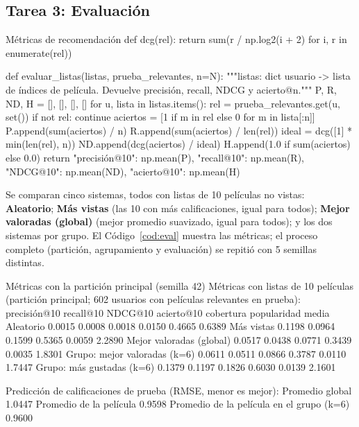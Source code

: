 \documentclass[11pt,letterpaper]{article}
\begin{document}
\subsection{Tarea 3: Evaluación}

\begin{codigo}[label=cod:eval]{Métricas de recomendación}
def dcg(rel):
    return sum(r / np.log2(i + 2) for i, r in enumerate(rel))


def evaluar_listas(listas, prueba_relevantes, n=N):
    """listas: dict usuario -> lista de índices de película. Devuelve precisión, recall, NDCG y acierto@n."""
    P, R, ND, H = [], [], [], []
    for u, lista in listas.items():
        rel = prueba_relevantes.get(u, set())
        if not rel:
            continue
        aciertos = [1 if m in rel else 0 for m in lista[:n]]
        P.append(sum(aciertos) / n)
        R.append(sum(aciertos) / len(rel))
        ideal = dcg([1] * min(len(rel), n))
        ND.append(dcg(aciertos) / ideal)
        H.append(1.0 if sum(aciertos) else 0.0)
    return {"precisión@10": np.mean(P), "recall@10": np.mean(R), "NDCG@10": np.mean(ND), "acierto@10": np.mean(H)}
\end{codigo}

Se comparan cinco sistemas, todos con listas de 10 películas no vistas: \textbf{Aleatorio}; \textbf{Más vistas} (las 10 con más calificaciones, igual para todos); \textbf{Mejor valoradas (global)} (mejor promedio suavizado, igual para todos); y los dos sistemas por grupo. El Código~\ref{cod:eval} muestra las métricas; el proceso completo (partición, agrupamiento y evaluación) se repitió con 5 semillas distintas.

\begin{consola}[label=out:met]{Métricas con la partición principal (semilla 42)}
Métricas con listas de 10 películas (partición principal; 602 usuarios con películas relevantes en prueba):
                              precisión@10  recall@10  NDCG@10  acierto@10  cobertura  popularidad media
Aleatorio                           0.0015     0.0008   0.0018      0.0150     0.4665             0.6389
Más vistas                          0.1198     0.0964   0.1599      0.5365     0.0059             2.2890
Mejor valoradas (global)            0.0517     0.0438   0.0771      0.3439     0.0035             1.8301
Grupo: mejor valoradas (k=6)        0.0611     0.0511   0.0866      0.3787     0.0110             1.7447
Grupo: más gustadas (k=6)           0.1379     0.1197   0.1826      0.6030     0.0139             2.1601

Predicción de calificaciones de prueba (RMSE, menor es mejor):
Promedio global                              1.0447
Promedio de la película                      0.9598
Promedio de la película en el grupo (k=6)    0.9600
\end{consola}
\end{document}
